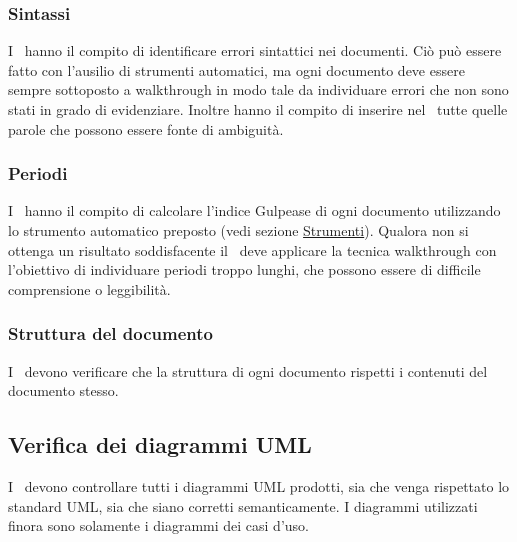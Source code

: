 \documentclass[../NormeProgetto.tex]{subfiles}
\begin{document}
			\subsubsection{Sintassi}
			I \verificatori\ hanno il compito di identificare errori sintattici nei documenti. Ciò può essere fatto con l'ausilio di strumenti automatici, ma ogni documento deve essere sempre sottoposto a walkthrough in modo tale da individuare errori che non sono stati in grado di evidenziare. Inoltre hanno il compito di inserire nel \glossario\ tutte quelle parole che possono essere fonte di ambiguità.
			\subsubsection{Periodi}
			I \verificatori\ hanno il compito di calcolare l’indice Gulpease di ogni documento utilizzando lo strumento automatico preposto (vedi sezione \hyperref[sec:Strumenti]{Strumenti}). Qualora non si ottenga un risultato soddisfacente il \verificatore\ deve applicare la tecnica walkthrough con l'obiettivo di individuare periodi troppo lunghi, che possono essere di difficile comprensione o leggibilità.
			\subsubsection{Struttura del documento}
			I \verificatori\ devono verificare che la struttura di ogni documento rispetti i contenuti del documento stesso.
			\subsection{Verifica dei diagrammi UML}
			I \verificatori\ devono controllare tutti i diagrammi UML prodotti, sia che venga rispettato lo standard UML, sia che siano corretti semanticamente. I diagrammi utilizzati finora sono solamente i diagrammi dei casi d'uso.
\end{document}
